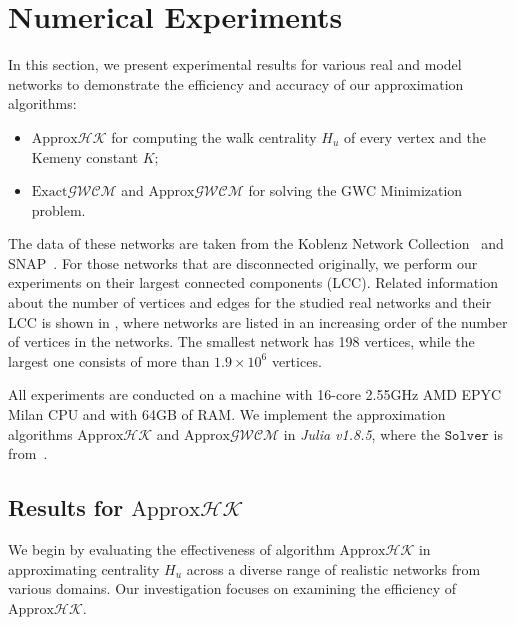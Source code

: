 \documentclass[10pt,twocolumn,twoside]{IEEEtran}
\begin{document}
\section{Numerical Experiments}

In this section, we present experimental results for various real and model networks to demonstrate the  efficiency and accuracy of our approximation algorithms:
\begin{itemize}
    \item \(\text{Approx}\mathcal{HK}\) for computing the walk centrality \(H_u\) of  every vertex and the Kemeny constant \(K\);
    \item \(\text{Exact}\mathcal{GWCM}\) and \(\text{Approx}\mathcal{GWCM}\) for solving the GWC Minimization problem.
\end{itemize}

The data of these networks are taken from the Koblenz Network Collection~\cite{Ku13} and SNAP~\cite{LeKr14}. For those networks that are disconnected originally, we perform our experiments on their largest connected components (LCC). Related information about the number of vertices and edges for the studied real networks and their LCC is shown  in ,  where networks are listed in an increasing order of the number of vertices in the networks. The smallest network has 198 vertices, while the largest one consists of more than \(1.9 \times 10^{6}\) vertices.

All experiments are conducted on a machine with 16-core 2.55GHz AMD EPYC Milan CPU and with 64GB of RAM. We implement the approximation algorithms \(\text{Approx}\mathcal{HK}\) and \(\text{Approx}\mathcal{GWCM}\) in \textit{Julia v1.8.5}, where the \(\mathtt{Solver}\) is from~\cite{GaKySp23}. %

\subsection{Results for \(\text{Approx}\mathcal{HK}\)}

We begin by evaluating the effectiveness of algorithm \(\text{Approx}\mathcal{HK}\) in approximating centrality \(H_u\) across a diverse range of realistic networks from various domains. Our investigation focuses on examining the efficiency of \(\text{Approx}\mathcal{HK}\).

\end{document}
